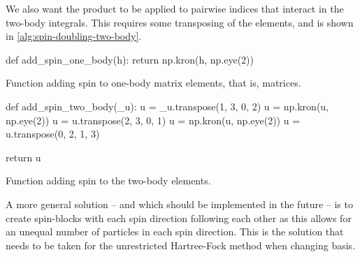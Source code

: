         We also want the product to be applied to pairwise indices that interact
        in the two-body integrals.
        This requires some transposing of the elements, and is shown in
        \autoref{alg:spin-doubling-two-body}.
        \begin{algorithm}
            \begin{python}
def add_spin_one_body(h):
    return np.kron(h, np.eye(2))
            \end{python}
            \caption{Function adding spin to one-body matrix elements, that is,
            matrices.}
            \label{alg:spin-doubling-one-body}
        \end{algorithm}
        \begin{algorithm}
            \begin{python}
def add_spin_two_body(_u):
    u = _u.transpose(1, 3, 0, 2)
    u = np.kron(u, np.eye(2))
    u = u.transpose(2, 3, 0, 1)
    u = np.kron(u, np.eye(2))
    u = u.transpose(0, 2, 1, 3)

    return u
            \end{python}
            \caption{Function adding spin to the two-body elements.}
            \label{alg:spin-doubling-two-body}
        \end{algorithm}

        A more general solution -- and which should be implemented in the future
        -- is to create spin-blocks with each spin direction following each
        other as this allows for an unequal number of particles in each
        spin direction.
        This is the solution that needs to be taken for the unrestricted
        Hartree-Fock method when changing basis.

